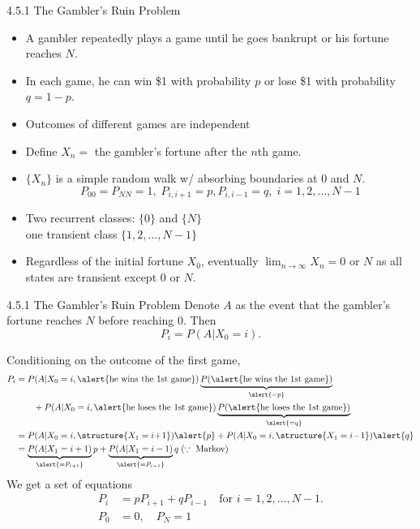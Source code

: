 \documentclass[letterpaper,handout, mathserif]{beamer}
\begin{document}
\begin{frame}{4.5.1 The Gambler's Ruin Problem}
\begin{itemize}
\item A gambler repeatedly plays a game until he goes bankrupt or his fortune reaches $N$.
\item In each game, he can win \$1 with probability $p$ or lose \$1 with probability $q=1-p$.
\item Outcomes of different games are independent
\item Define $X_n=$ the gambler's fortune after the $n$th game.
\item $\{X_n\}$ is a simple random walk w/ absorbing boundaries at 0 and $N$.
\[P_{00} = P_{NN} = 1, \;P_{i,i+1} = p, P_{i,i-1}=q ,\; i = 1, 2,\ldots, N - 1\]
\item Two recurrent classes: $\{0\}$ and $\{N\}$\\
one transient class $\{1, 2,\ldots, N - 1\}$
\item Regardless of the initial fortune $X_0$, eventually $\lim_{n\to\infty}X_n=0$ or $N$
as all states are transient except 0 or $N$.
\end{itemize}
\end{frame}
\begin{frame}{4.5.1 The Gambler's Ruin Problem}\small
Denote $A$ as the event that the gambler's fortune reaches $N$ before reaching 0.
Then
\[P_i=P(A|X_0=i).\]

Conditioning on the outcome of the first game,
\begin{align*}
P_i&=P(A|X_0=i, \alert{\text{he wins the 1st game}})
     \underbrace{P(\alert{\text{he wins the 1st game}})}_{\alert{=p}}\\
  &\qquad+ P(A|X_0=i,\alert{\text{he loses the 1st game}})
     \underbrace{P(\alert{\text{he loses the 1st game}})}_{\alert{=q}}\\
&=P(A|X_0=i,\structure{X_1=i\!+\!1})\alert{p}+ P(A|X_0=i,\structure{X_1=i\!-\!1})\alert{q}\\
&=\underbrace{P(A|X_1=i+1)}_{\alert{=P_{i+1}}}p+
\underbrace{P(A|X_1=i-1)}_{\alert{=P_{i-1}}}q \;(\because\text{ Markov})
\end{align*}
We get a set of equations
\begin{align*}
P_i&=pP_{i+1}+qP_{i-1} \quad\text{for }i=1,2,\ldots,N-1.\\
P_0&=0,\quad P_N=1
\end{align*}
\end{frame}
\end{document}
